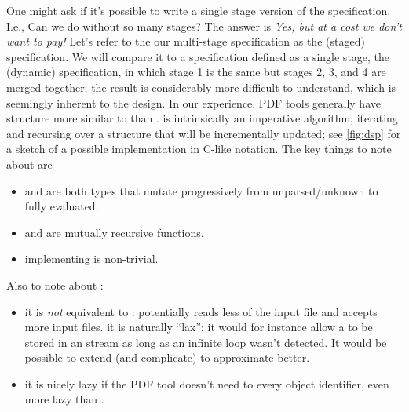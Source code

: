 One might ask if it's possible to write a single stage version of the
specification.  I.e., Can we do without so many stages?
The answer is \emph{Yes, but at a cost we don't want to pay!}
Let's refer to the our multi-stage specification as the \ssp{}
(staged) specification.
%
We will compare it to a specification defined as a single stage, the \dsp{} (dynamic) specification, in which stage 1 is the same
but stages 2, 3, and 4 are
merged together;
%
the result is considerably more difficult to understand, which is seemingly inherent to the design.
%
In our experience, PDF tools generally have structure more similar to \dsp{} than \ssp{}.
\dsp{} is intrinsically an imperative algorithm, iterating and recursing over a structure that 
will be incrementally updated;
%
see \cref{fig:dsp} for a sketch
of a possible implementation in C-like notation.
The key things to note about \dsp{} are
\begin{itemize}
\item {} and  are both types that mutate progressively
   from unparsed/unknown to fully evaluated.
\item {} and  are mutually recursive functions.
\item implementing  is non-trivial.
\end{itemize}
Also to note about \dsp{}:
\begin{itemize}
\item it is \emph{not} equivalent to \ssp{}: \dsp{} potentially reads
  less of the input file and accepts more input files.  it is
  naturally ``lax'': it would for instance allow a  to
  be stored in an  stream as long as an infinite loop
  wasn't detected.  It would be possible to extend (and complicate) \dsp{}
  to approximate \ssp{} better.
\item it is nicely lazy if the PDF tool doesn't need to 
  every object identifier, even more lazy than \ssp{}.
\end{itemize}

